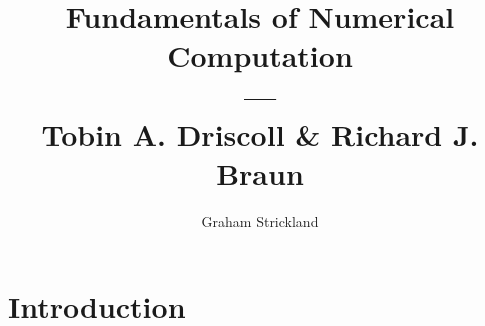 \documentclass{article}
\title{Fundamentals of Numerical Computation\\---\\Tobin A. Driscoll \& Richard J. Braun}
\author{Graham Strickland}
\begin{document}
\maketitle  

\section{Introduction}

\end{document}
